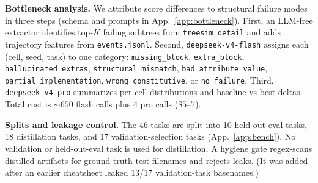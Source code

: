 \documentclass{article}
\begin{document}
\textbf{Bottleneck analysis.} We attribute score differences to structural failure modes in three steps (schema and prompts in App.~\ref{app:bottleneck}). First, an LLM-free extractor identifies top-$K$ failing subtrees from \texttt{treesim\_detail} and adds trajectory features from \texttt{events.jsonl}. Second, \texttt{deepseek-v4-flash} assigns each (cell, seed, task) to one category: \texttt{missing\_block}, \texttt{extra\_block}, \texttt{hallucinated\_extras}, \texttt{structural\_mismatch}, \texttt{bad\_attribute\_value}, \texttt{partial\_implementation}, \texttt{wrong\_constitutive}, or \texttt{no\_failure}. Third, \texttt{deepseek-v4-pro} summarizes per-cell distributions and baseline-vs-best deltas. Total cost is ${\sim}650$ flash calls plus 4 pro calls ($\$5\text{--}7$).

\textbf{Splits and leakage control.} The 46 tasks are split into 10 held-out-eval tasks, 18 distillation tasks, and 17 validation-selection tasks (App.~\ref{app:bench}). No validation or held-out-eval task is used for distillation. A hygiene gate regex-scans distilled artifacts for ground-truth test filenames and rejects leaks. (It was added after an earlier cheatsheet leaked 13/17 validation-task basenames.)


\end{document}
